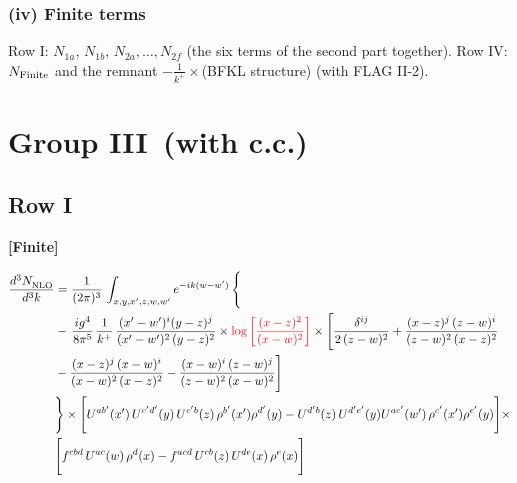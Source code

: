 \documentclass[9pt]{article}
\numberwithin{equation}{section}
\begin{document}
\subsubsection{(iv) Finite terms}
\noindent Row I: $N_{1a}$, $N_{1b}$, $N_{2a},\dots,N_{2f}$ (the six terms of the second part together). Row IV: $N_{\rm Finite}$ and the remnant $-\frac{1}{k^{+}}\times$(BFKL structure) (with FLAG II-2).
\section{Group III\, (with c.c.)}
\subsection{Row I}
\par\smallskip\noindent\textbf{[Finite]}\par\nobreak
\begin{align}
     \frac{d^{3}N_{\rm NLO}^{\rm}}{d^{3}k}  & =   \frac{1}{(2\pi)^{3}}\, \int_{x,y,x',z,w,w^{\prime}} e^{-ik(w-w^{\prime})}\, \Bigg\{\notag \\
& -\,\frac{ig^{4}}{8\pi^{5}}\,\frac{1}{k^{+}}\,\frac{(x'-w')^{i}(y-z)^{j}}{(x'-w')^{2}\,(y-z)^{2}}\times {\color{red}\log{\left[\frac{(x-z)^{2}}{(x-w)^{2}}\right]}}\times \Bigg[\frac{\delta^{ij}}{2\,(z-w)^{2}}+\frac{(x-z)^{j}\,(z-w)^{i}}{(z-w)^{2}\,(x-z)^{2}}\notag \\ & -\frac{(x-z)^{j}\,(x-w)^{i}}{(x-w)^{2}\,(x-z)^{2}}-\frac{(x-w)^{i}\,(z-w)^{j}}{(z-w)^{2}\,(x-w)^{2}}\Bigg] \notag \\
& \Bigg\}\times \Bigg[U^{ab'}(x')\,U^{c'd'}(y)\,U^{c'b}(z)\,\rho^{b'}(x')\rho^{d'}(y)-U^{d'b}(z)\,U^{d'e'}(y)U^{ac'}(w')\,\rho^{c'}(x')\rho^{e'}(y)\Bigg]\times\notag \\ & \Bigg[f^{cbd}\,U^{ac}(w)\,\rho^{d}(x)-f^{acd}\, U^{cb}(z)\,U^{de}(x)\,\rho^{e}(x)\Bigg]
\end{align}
\end{document}
